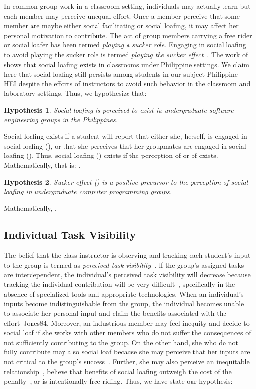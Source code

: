\documentclass[a4paper,a4paper,BCOR12mm,12pt,abstracton,pointednumbers,tablecaptionabove,footinclude,halfparskip,normalheadings,]{scrartcl}
\newtheorem{hypothesis}{Hypothesis}
\begin{document}
In common group work in a classroom setting, individuals may actually learn but each member may perceive unequal effort. Once a member perceive that some member are maybe either social facilitating  or social loafing, it may affect her personal motivation to contribute. The act of group members carrying a free rider or social loafer has been termed {\em playing a sucker role}. Engaging in social loafing to avoid playing the sucker role is termed {\em playing the sucker effect}~\citep{Kerr83}. The work of~\citet{Pabico08} shows that social loafing exists in classrooms under Philippine settings. We claim here that social loafing still persists among students in our subject Philippine HEI despite the efforts of instructors to avoid such behavior in the classroom and laboratory settings. Thus, we hypothesize that:

\begin{hypothesis}
Social loafing is perceived to exist in undergraduate software engineering groups in the Philippines.\label{hyp:socloaf}
\end{hypothesis}

Social loafing exists if a student will report that either she, herself, is engaged in social loafing (), or that she perceives that her groupmates are engaged in social loafing (). Thus, social loafing () exists if the perception  of  or  of  exists. Mathematically, that is: .

\begin{hypothesis}
Sucker effect () is a positive precursor to the perception of social loafing in undergraduate computer programming groups.\label{hyp:sucker}
\end{hypothesis}

Mathematically, .

\subsection{Individual Task Visibility}

The belief that the class instructor is observing and tracking each student's input to the group is termed as {\em perceived task visibility}~\citep{Kidwell93}. If the group's assigned tasks are interdependent, the individual's perceived task visibility will decrease because tracking the individual contribution will be very difficult~\citep{Jones84}, specifically in the absence of specialized tools and appropriate technologies. When an individual's inputs become indistinguishable from the group, the individual becomes unable to associate her personal input and claim the benefits associated with the effort~{Jones84}. Moreover, an industrious member may feel inequity and decide to social loaf if she works with other members who do not suffer the consequences of not sufficiently contributing to the group. On the other hand, she who do not fully contribute may also social loaf because she may perceive that her inputs are not critical to the group's success~\citep{Karau93}. Further, she may also perceive an inequitable relationship~\citep{Walster73}, believe that benefits of social loafing outweigh the cost of the penalty~\citep{Murphy03}, or is intentionally free riding. Thus, we have state our hypothesis:
\end{document}
